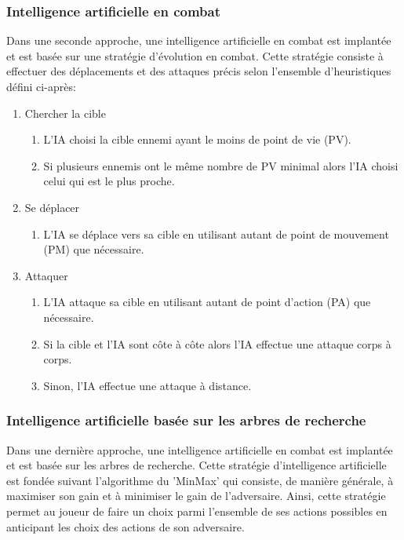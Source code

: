\documentclass[11pt, a4paper]{article}
\begin{document}
\subsubsection{Intelligence artificielle en combat}
Dans une seconde approche, une intelligence artificielle en combat est implantée et est basée sur une stratégie d'évolution en combat. Cette stratégie consiste à effectuer des déplacements et des attaques précis selon l'ensemble d'heuristiques défini ci-après:
\begin{enumerate}
 
 \item Chercher la cible
  \begin{enumerate}
   \item L'IA choisi la cible ennemi ayant le moins de point de vie (PV).
   \item Si plusieurs ennemis ont le même nombre de PV minimal alors l'IA choisi celui qui est le plus proche.
  \end{enumerate}
 
 \item Se déplacer
  \begin{enumerate}
   \item L'IA se déplace vers sa cible en utilisant autant de point de mouvement (PM) que nécessaire.
  \end{enumerate}
 
 \item Attaquer
  \begin{enumerate}
   \item L'IA attaque sa cible en utilisant autant de point d'action (PA) que nécessaire.
   \item Si la cible et l'IA sont côte à côte alors l'IA effectue une attaque corps à corps.
   \item Sinon, l'IA effectue une attaque à distance.
  \end{enumerate}

\end{enumerate}

\subsubsection{Intelligence artificielle basée sur les arbres de recherche}
Dans une dernière approche, une intelligence artificielle en combat est implantée et est basée sur les arbres de recherche.
Cette stratégie d'intelligence artificielle est fondée suivant l'algorithme du 'MinMax' qui consiste, de manière générale, à maximiser son gain et à minimiser le gain de l'adversaire.
Ainsi, cette stratégie permet au joueur de faire un choix parmi l'ensemble de ses actions possibles en anticipant les choix des actions de son adversaire.
\end{document}
